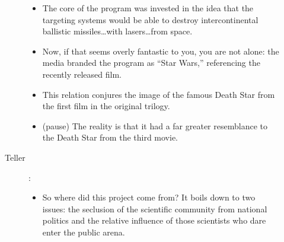 \documentclass[12pt]{article}
\begin{document}
\begin{description}
\begin{description}
\begin{itemize}
          \item The core of the program was invested in the idea that the
            targeting systems would be able to destroy intercontinental
            ballistic missiles\ldots with lasers\ldots from space.

          \item Now, if that seems overly fantastic to you, you are not alone:
            the media branded the program as ``Star Wars,'' referencing the
            recently released film.

          \item This relation conjures the image of the famous Death Star from
            the first film in the original trilogy.

          \item (pause) The reality is that it had a far greater resemblance to
            the Death Star from the third movie.
        

        \end{itemize}

      \item[Teller]:
        \begin{itemize}

          \item So where did this project come from? It boils down to two
            issues: the seclusion of the scientific community from national
            politics and the relative influence of those scientists who dare
            enter the public arena.


\end{itemize}
\end{description}
\end{description}
\end{document}
